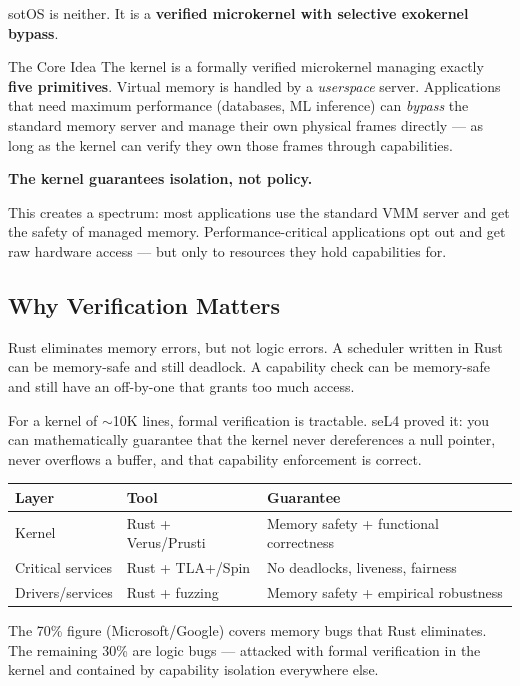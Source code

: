 \documentclass[11pt,a4paper]{article}
\begin{document}
sotOS is neither. It is a \textbf{verified microkernel with selective exokernel bypass}.

\begin{principalbox}{The Core Idea}
The kernel is a formally verified microkernel managing exactly \textbf{five primitives}.
Virtual memory is handled by a \textit{userspace} server.
Applications that need maximum performance (databases, ML inference) can
\textit{bypass} the standard memory server and manage their own physical frames
directly --- as long as the kernel can verify they own those frames through capabilities.

\textbf{The kernel guarantees isolation, not policy.}
\end{principalbox}

This creates a spectrum: most applications use the standard VMM server and
get the safety of managed memory. Performance-critical applications opt out
and get raw hardware access --- but only to resources they hold capabilities for.

\subsection{Why Verification Matters}

Rust eliminates memory errors, but not logic errors. A scheduler written in Rust
can be memory-safe and still deadlock. A capability check can be memory-safe
and still have an off-by-one that grants too much access.

For a kernel of $\sim$10K lines, formal verification is tractable. seL4 proved it:
you can mathematically guarantee that the kernel never dereferences a null pointer,
never overflows a buffer, and that capability enforcement is correct.

\begin{center}
\begin{tabular}{lll}
\toprule
\textbf{Layer} & \textbf{Tool} & \textbf{Guarantee} \\
\midrule
Kernel          & Rust + Verus/Prusti     & Memory safety + functional correctness \\
Critical services & Rust + TLA+/Spin     & No deadlocks, liveness, fairness \\
Drivers/services  & Rust + fuzzing       & Memory safety + empirical robustness \\
\bottomrule
\end{tabular}
\end{center}

The 70\% figure (Microsoft/Google) covers memory bugs that Rust eliminates.
The remaining 30\% are logic bugs --- attacked with formal verification in the kernel
and contained by capability isolation everywhere else.
\end{document}
